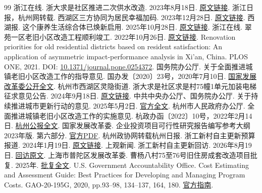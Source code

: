 \documentclass[UTF8,11pt,fontset=windows]{ctexart}
\begin{document}
\begin{thebibliography}{99}
\small
\setlength{\itemsep}{1pt}
\setlength{\parsep}{0pt}
\setlength{\parskip}{0pt}
 浙江在线. 浙大求是社区推进二次供水改造. 2023年8月18日. \href{https://town.zjol.com.cn/czjsb/202308/t20230818_26113017.shtml}{原文链接}.
 浙江日报，杭州网转载. 西湖区三方协同为居民幸福加码. 2023年12月28日. \href{https://hznews.hangzhou.com.cn/shehui/content/2023-12/28/content_8666802.htm}{原文链接}.
 西湖报. 这个康养生活综合体已焕新启用. 2025年10月28日. \href{https://xhb.xihunet.cn/h5/html5/2025-10/28/content_9248_18995526.htm}{原文链接}.
 浙江在线. 翠苑一区老旧小区改造工程顺利竣工. 2022年10月26日. \href{https://cs.zjol.com.cn/kzl/202210/t20221026_24968653.shtml}{原文链接}.
 Renovation priorities for old residential districts based on resident satisfaction: An application of asymmetric impact-performance analysis in Xi'an, China. PLOS ONE, 2021. DOI: \href{https://doi.org/10.1371/journal.pone.0254372}{10.1371/journal.pone.0254372}.
 国务院办公厅. 关于全面推进城镇老旧小区改造工作的指导意见. 国办发〔2020〕23号，2020年7月10日. \href{https://www.ndrc.gov.cn/fzggw/jgsj/tzs/sjdt/202007/t20200728_1234742.html}{国家发展改革委公开全文}.
 杭州市西湖区灵隐街道. 浙大求是社区求是村75幢1单元加装电梯征求意见公告. 2024年9月18日. \href{https://www.hzxh.gov.cn/art/2024/9/18/art_1229516984_59041263.html}{原文链接}.
 中共中央办公厅、国务院办公厅. 关于持续推进城市更新行动的意见. 2025年5月2日. \href{https://www.mee.gov.cn/zcwj/zyygwj/202505/t20250516_1119546.shtml}{官方全文}.
 杭州市人民政府办公厅. 全面推进城镇老旧小区改造工作的实施意见. 杭政办函〔2022〕10号，2022年2月14日. \href{https://zfgb.hangzhou.gov.cn/10/105220253/t117220253054/518761.shtml}{杭州公报全文}.
 国家发展改革委. 企业投资项目可行性研究报告编写参考大纲 2023年版. 第六部分. \href{https://www.ndrc.gov.cn/xxgk/zcfb/ghxwj/202304/P020230407401908613786.pdf}{官方PDF}.
 杭州政协网转载杭州日报. 浙工新村自主更新预算报道. 2024年1月19日. \href{https://www.hzzx.gov.cn/cshz/content/2024-01/19/content_8677402.htm}{原文链接}.
 上观新闻. 浙工新村自主更新回访. 2026年8月19日. \href{https://www.jfdaily.com/wx/detail.do?id=1162310}{回访原文}.
 上海市普陀区发展改革委. 曹杨八村75至76号旧住房成套改造项目批复. 2025年. \href{https://www.shpt.gov.cn/zhengwu/xmjyssp-fgwzdgz/2025/42/194395.html}{批复全文}.
 U.S. Government Accountability Office. Cost Estimating and Assessment Guide: Best Practices for Developing and Managing Program Costs. GAO-20-195G, 2020, pp.93--98, 134--137, 164, 180. \href{https://www.gao.gov/assets/gao-20-195g.pdf}{官方指南}.

\end{thebibliography}
\end{document}

